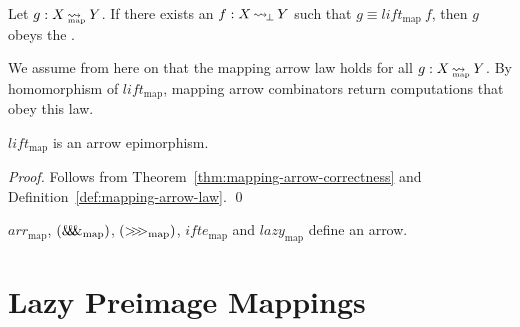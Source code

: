 \documentclass{llncs}
\newcommand{\arrow}{\rightsquigarrow}
\newcommand{\arrowlift}{\ensuremath{lift}}
\newcommand{\arrowarr}{\ensuremath{arr}}
\newcommand{\arrowcomp}{\ensuremath{{>}\mspace{-6mu}{>}\mspace{-6mu}{>}}}
\newcommand{\arrowpair}{\ensuremath{\mathit{\&\mspace{-7.5mu}\&\mspace{-7.5mu}\&}}}
\newcommand{\arrowif}{\ensuremath{ifte}}
\newcommand{\arrowlazy}{\ensuremath{lazy}}
\DeclareMathOperator{\botto}{\arrow_{\mspace{-3mu}\bot}}
\newcommand{\map}{_\mathrm{map}}
\DeclareMathOperator{\mapto}{\arrow_{\mspace{-21mu}\map}}
\newcommand{\liftmap}{\arrowlift\map}
\newcommand{\arrmap}{\arrowarr\map}
\newcommand{\compmap}{\arrowcomp\map}
\newcommand{\pairmap}{\arrowpair\map}
\newcommand{\ifmap}{\arrowif\map}
\newcommand{\lazymap}{\arrowlazy\map}
\begin{document}
\begin{definition}
\label{def:mapping-arrow-law}
Let $g : X \mapto Y$. If there exists an $f : X \botto Y$ such that $g \equiv \liftmap~f$, then $g$ obeys the .%
\end{definition}

We assume from here on that the mapping arrow law holds for all $g : X \mapto Y$.
By homomorphism of $\liftmap$, mapping arrow combinators return computations that obey this law.

\begin{theorem}
$\liftmap$ is an arrow epimorphism.
\end{theorem}
\begin{proof}
Follows from Theorem~\ref{thm:mapping-arrow-correctness} and Definition~\ref{def:mapping-arrow-law}.
\qed
\end{proof}

\begin{corollary}
$\arrmap$, $(\pairmap)$, $(\compmap)$, $\ifmap$ and $\lazymap$ define an arrow.
\end{corollary}



\section{Lazy Preimage Mappings}
\label{sec:lazy-preimage-mappings}
\end{document}
